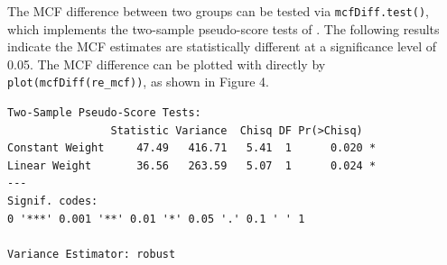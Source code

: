 The MCF difference between two groups can be tested via
\texttt{mcfDiff.test()}, which implements the two-sample pseudo-score
tests of \citep{cook1996biometrics}. The following results indicate the
MCF estimates are statistically different at a significance level of
0.05. The MCF difference can be plotted with directly by
\texttt{plot(mcfDiff(re\_mcf))}, as shown in Figure 4.

\begin{Shaded}
\begin{Highlighting}[]
\end{Highlighting}
\end{Shaded}

\begin{verbatim}
Two-Sample Pseudo-Score Tests:
                Statistic Variance  Chisq DF Pr(>Chisq)  
Constant Weight     47.49   416.71   5.41  1      0.020 *
Linear Weight       36.56   263.59   5.07  1      0.024 *
---
Signif. codes:  
0 '***' 0.001 '**' 0.01 '*' 0.05 '.' 0.1 ' ' 1

Variance Estimator: robust 
\end{verbatim}
